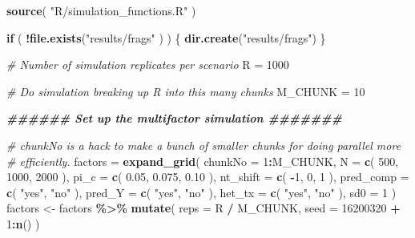 \documentclass[
]{book}
\newenvironment{Shaded}{\begin{snugshade}}{\end{snugshade}}
\newcommand{\AttributeTok}[1]{\textcolor[rgb]{0.13,0.29,0.53}{#1}}
\newcommand{\CommentTok}[1]{\textcolor[rgb]{0.56,0.35,0.01}{\textit{#1}}}
\newcommand{\ControlFlowTok}[1]{\textcolor[rgb]{0.13,0.29,0.53}{\textbf{#1}}}
\newcommand{\DecValTok}[1]{\textcolor[rgb]{0.00,0.00,0.81}{#1}}
\newcommand{\DocumentationTok}[1]{\textcolor[rgb]{0.56,0.35,0.01}{\textbf{\textit{#1}}}}
\newcommand{\FloatTok}[1]{\textcolor[rgb]{0.00,0.00,0.81}{#1}}
\newcommand{\FunctionTok}[1]{\textcolor[rgb]{0.13,0.29,0.53}{\textbf{#1}}}
\newcommand{\NormalTok}[1]{#1}
\newcommand{\OtherTok}[1]{\textcolor[rgb]{0.56,0.35,0.01}{#1}}
\newcommand{\SpecialCharTok}[1]{\textcolor[rgb]{0.81,0.36,0.00}{\textbf{#1}}}
\newcommand{\StringTok}[1]{\textcolor[rgb]{0.31,0.60,0.02}{#1}}
\begin{document}
\begin{Shaded}
\begin{Highlighting}[]
\FunctionTok{source}\NormalTok{( }\StringTok{"R/simulation\_functions.R"}\NormalTok{ )}

\ControlFlowTok{if}\NormalTok{ ( }\SpecialCharTok{!}\FunctionTok{file.exists}\NormalTok{(}\StringTok{"results/frags"}\NormalTok{ ) ) \{}
    \FunctionTok{dir.create}\NormalTok{(}\StringTok{"results/frags"}\NormalTok{)}
\NormalTok{\}}

\CommentTok{\# Number of simulation replicates per scenario}
\NormalTok{R }\OtherTok{=} \DecValTok{1000}

\CommentTok{\# Do simulation breaking up R into this many chunks}
\NormalTok{M\_CHUNK }\OtherTok{=} \DecValTok{10}

\DocumentationTok{\#\#\#\#\#\# Set up the multifactor simulation \#\#\#\#\#\#\#}

\CommentTok{\# chunkNo is a hack to make a bunch of smaller chunks for doing parallel more}
\CommentTok{\# efficiently.}
\NormalTok{factors }\OtherTok{=} \FunctionTok{expand\_grid}\NormalTok{( }\AttributeTok{chunkNo =} \DecValTok{1}\SpecialCharTok{:}\NormalTok{M\_CHUNK,}
                       \AttributeTok{N =} \FunctionTok{c}\NormalTok{( }\DecValTok{500}\NormalTok{, }\DecValTok{1000}\NormalTok{, }\DecValTok{2000}\NormalTok{ ),}
                       \AttributeTok{pi\_c =} \FunctionTok{c}\NormalTok{( }\FloatTok{0.05}\NormalTok{, }\FloatTok{0.075}\NormalTok{, }\FloatTok{0.10}\NormalTok{ ),}
                       \AttributeTok{nt\_shift =} \FunctionTok{c}\NormalTok{( }\SpecialCharTok{{-}}\DecValTok{1}\NormalTok{, }\DecValTok{0}\NormalTok{, }\DecValTok{1}\NormalTok{ ),}
                       \AttributeTok{pred\_comp =} \FunctionTok{c}\NormalTok{( }\StringTok{"yes"}\NormalTok{, }\StringTok{"no"}\NormalTok{ ),}
                       \AttributeTok{pred\_Y =} \FunctionTok{c}\NormalTok{( }\StringTok{"yes"}\NormalTok{, }\StringTok{"no"}\NormalTok{ ),}
                       \AttributeTok{het\_tx =} \FunctionTok{c}\NormalTok{( }\StringTok{"yes"}\NormalTok{, }\StringTok{"no"}\NormalTok{ ),}
                       \AttributeTok{sd0 =} \DecValTok{1}
\NormalTok{                       )}
\NormalTok{factors }\OtherTok{\textless{}{-}}\NormalTok{ factors }\SpecialCharTok{\%\textgreater{}\%} \FunctionTok{mutate}\NormalTok{(}
    \AttributeTok{reps =}\NormalTok{ R }\SpecialCharTok{/}\NormalTok{ M\_CHUNK,}
    \AttributeTok{seed =} \DecValTok{16200320} \SpecialCharTok{+} \DecValTok{1}\SpecialCharTok{:}\FunctionTok{n}\NormalTok{()}
\NormalTok{)}
\end{Highlighting}
\end{Shaded}
\end{document}
